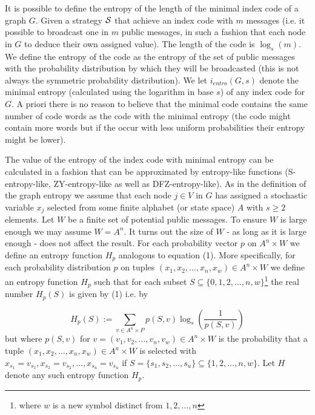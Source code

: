 \documentclass[12pt]{article}
\begin{document}
It is possible to define the entropy of the length of the minimal index code of a graph $G$.  Given
a strategy $\cal{S}$ that achieve an index code with $m$ messages (i.e. it possible to broadcast one in $m$ public messages, in such a fashion that each node in $G$ to deduce their own assigned value).
The length of the code is $\log_s(m)$. We define the entropy of the code as the entropy of the set of public messages with the probability distribution by which they will be broadcasted (this is not always the symmetric probability distribution). We let $i_{entro}(G,s)$ denote the minimal entropy (calculated using the logarithm in base $s$) of any index code for $G$.
A priori  there is no reason to believe that the minimal code contains the same number of code 
words as the code with the minimal entropy (the code might contain more words but if the occur
with less uniform probabilities their entropy might be lower). 

The value of the entropy of the index code with minimal entropy can be calculated in a fashion that
can be approximated by entropy-like functions (S-entropy-like, ZY-entropy-like as well as DFZ-entropy-like). As in the definition of the graph entropy we assume that each node $j\in V$ in $G$ has assigned a stochastic variable $x_j$ selected from some finite alphabet (or state space) $A$ with $s \geq 2$ elements. 
 Let $W$ be a finite set of potential public messages. To ensure $W$ is large enough we may assume $W=A^n$. It turns out the size of $W$ - as long as it is large enough - does not affect the result. 
 For each probability vector $p$ on $A^n \times W$  
 we define an entropy function $H_p$ analogous to equation (1). More specifically,
 for each probability distribution $p$ on tuples $(x_1,x_2,\ldots,x_n,x_w) \in A^n \times W$ we define an entropy function $H_{p}$ such that for each subset $S \subseteq \{0,1,2,\ldots, n,w\}$\footnote{where 
 $w$ is a new symbol distinct from $1,2, \ldots,n$} 
the real number 
$H_{p}(S)$ is given by (1) i.e. by

\begin{equation}
H_{p}(S):=\sum_{v \in A^n \times P} p(S,v) \log_{s}(\frac{1}{p(S,v)})
\end{equation}
but where $p(S,v)$ for $v=(v_1,v_2, \ldots,v_n, v_w) \in A^n \times W$ is the probability that a tuple 
$(x_1,x_2,\ldots,x_n, x_w)  \in A^n \times W$  is selected with 
$x_{s_1}=v_{s_1}, x_{s_2}=v_{s_2}, \ldots, x_{s_u}=v_{s_u}$ if 
$S=\{s_1,s_2,\ldots,s_u\} \subseteq \{1,2,\ldots,n,w\}$. 
Let $H$ denote any such entropy function $H_p$. 
\end{document}

